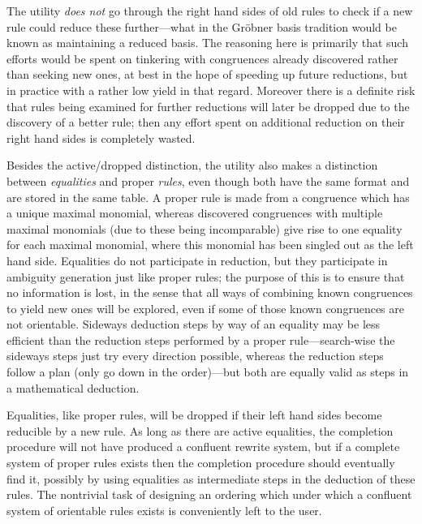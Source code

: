 \documentclass{article}
\theoremstyle{definition}
\begin{document}
The utility \emph{does not} go through the right hand sides of old 
rules to check if a new rule could reduce these further---what in the 
Gr\"obner basis tradition would be known as maintaining a reduced 
basis. The reasoning here is primarily that such efforts would be 
spent on tinkering with congruences already discovered rather than 
seeking new ones, at best in the hope of speeding up future 
reductions, but in practice with a rather low yield in that regard. 
Moreover there is a definite risk that rules being examined for 
further reductions will later be dropped due to the discovery of a 
better rule; then any effort spent on additional reduction on their 
right hand sides is completely wasted.

Besides the active\slash dropped distinction, the utility also makes 
a distinction between \emph{equalities} and proper \emph{rules}, even 
though both have the same format and are stored in the same table. A 
proper rule is made from a congruence which has a unique maximal 
monomial, whereas discovered congruences with multiple maximal 
monomials (due to these being incomparable) give rise to one equality 
for each maximal monomial, where this monomial has been singled out 
as the left hand side. Equalities do not participate in reduction, 
but they participate in ambiguity generation just like proper rules; 
the purpose of this is to ensure that no information is lost, in the 
sense that all ways of combining known congruences to yield new ones 
will be explored, even if some of those known congruences are not 
orientable. Sideways deduction steps by way of an equality may be 
less efficient than the reduction steps performed by a proper 
rule---search-wise the sideways steps just try every direction 
possible, whereas the reduction steps follow a plan (only go down in 
the order)---but both are equally valid as steps in a mathematical 
deduction.

Equalities, like proper rules, will be dropped if their left hand 
sides become reducible by a new rule. As long as there are active 
equalities, the completion procedure will not have produced a 
confluent rewrite system, but if a complete system of proper rules 
exists then the completion procedure should eventually find it, 
possibly by using equalities as intermediate steps in the deduction 
of these rules. The nontrivial task of designing an ordering which 
under which a confluent system of orientable rules exists is 
conveniently left to the user.
\end{document}
